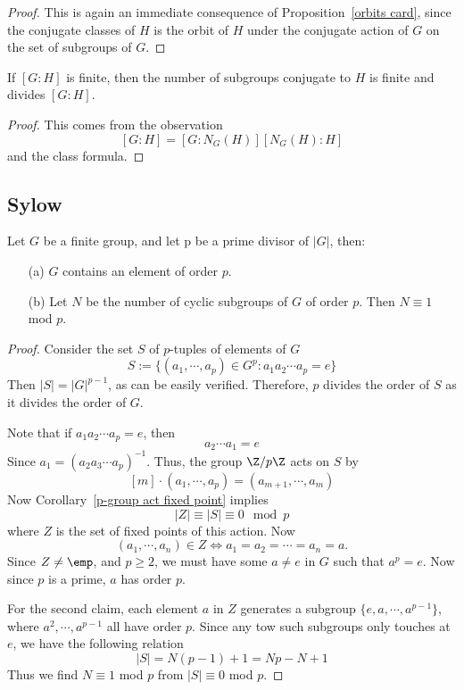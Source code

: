 \begin{proof}
This is again an immediate consequence of Proposition~\ref{orbits card}, since the conjugate classes of $H$ is the orbit of $H$ under the conjugate action of $G$ on the set of subgroups of $G$.
\end{proof}
\begin{corollary}
If $[G:H]$ is finite, then the number of subgroups conjugate to $H$ is finite and divides $[G:H]$.
\end{corollary}
\begin{proof}
This comes from the observation
\[[G:H]=[G:N_G(H)][N_G(H):H]\]
and the class formula.
\end{proof}
\subsection{Sylow }
\begin{theorem}
Let $G$ be a finite group, and let p be a prime divisor of $|G|$, then:
\begin{itemize}
\item[(a)] $G$ contains an element of order $p$.
\item[(b)] Let $N$ be the number of cyclic subgroups of $G$ of order $p$. Then $N\equiv1$ mod $p$.
\end{itemize}
\end{theorem}
\begin{proof}
Consider the set $S$ of $p$-tuples of elements of $G$ 
\[S:=\{(a_1,\cdots,a_p)\in G^p:a_1a_2\cdots a_p=e\}\]
Then $|S|=|G|^{p-1}$, as can be easily verified. Therefore, $p$ divides the order of $S$ as it divides the order of $G$.\par
Note that if $a_1a_2\cdots a_p=e$, then
\[a_{2}\cdots a_1=e\]
Since $a_1=(a_2a_3\cdots a_p)^{-1}$. Thus, the group $\Z/p\Z$ acts on $S$ by
\[[m]\cdot(a_1,\cdots,a_p)=(a_{m+1},\cdots,a_m)\]
Now Corollary~\ref{p-group act fixed point} implies
\[|Z|\equiv|S|\equiv 0\mod{p}\]
where $Z$ is the set of fixed points of this action. Now
\[(a_1,\cdots,a_n)\in Z\iff a_1=a_2=\cdots=a_n=a.\]
Since $Z\neq\emp$, and $p\geq 2$, we must have some $a\neq e$ in $G$ such that $a^p=e$. Now since $p$ is a prime, $a$ has order $p$.\par
For the second claim, each element $a$ in $Z$ generates a subgroup $\{e,a,\cdots,a^{p-1}\}$, where $a^2,\cdots,a^{p-1}$ all have order $p$. Since any tow such subgroups only touches at $e$, we have the following relation
\[|S|=N(p-1)+1=Np-N+1\]
Thus we find $N\equiv 1$ mod $p$ from $|S|\equiv 0$ mod $p$.
\end{proof}
